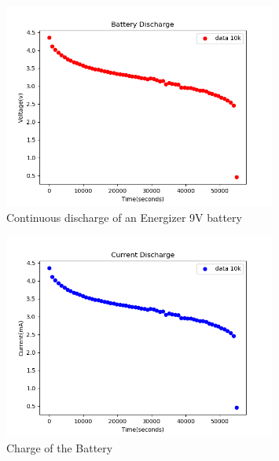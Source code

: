 \documentclass[12pt]{article}
\begin{document}
\begin{figure}[h]
\begin{center}
\includegraphics[width=0.8\textwidth]{VoltageDisch_all}
\caption{Continuous discharge of an Energizer 9V battery}
\label{fig:voltage}
\end{center}
\end{figure}

\begin{figure}[h]
\begin{center}
\includegraphics[width=0.8\textwidth]{CurrentDisch_all}
\caption{Charge of the Battery}
\label{fig:charge}
\end{center}
\end{figure}
\end{document}
